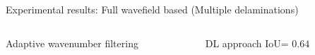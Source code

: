 \documentclass[10pt,aspectratio=169,dvipsnames]{beamer} %
\begin{document}
\begin{frame}{Experimental results: Full wavefield based (Multiple delaminations)}
\begin{columns}[T]
\begin{column}[t]{0.40\textwidth}
\begin{block}{Adaptive wavenumber filtering}
\begin{figure}[ht!]
				\end{figure}
			\end{block}	
		\end{column}
		\begin{column}[t]{0.40\textwidth}				
			\begin{alertblock}{DL approach}	
				\footnotesize IoU= $0.64$						
				\begin{figure}[ht!]	
					\centering

\end{figure}
\end{alertblock}
\end{column}
\end{columns}
\end{frame}
\end{document}
